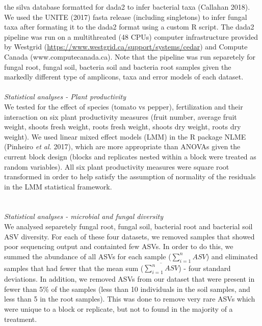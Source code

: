 \documentclass[11pt,]{article}
\begin{document}
the silva database formatted for dada2 to infer bacterial taxa (Callahan
2018). We used the UNITE (2017) fasta release (including singletons) to
infer fungal taxa after formating it to the dada2 format using a custom
R script. The dada2 pipeline was run on a multithreated (48 CPUs)
computer infrastructure provided by Westgrid
(\url{https://www.westgrid.ca/support/systems/cedar}) and Compute Canada
(www.computecanada.ca). Note that the pipeline was run separetely for
fungal root, fungal soil, bacteria soil and bacteria root samples given
the markedly different type of amplicons, taxa and error models of each
dataset. ~\\
\hspace*{0.333em}\\
\emph{Statistical analyses - Plant productivity}\\
We tested for the effect of species (tomato vs pepper), fertilization
and their interaction on six plant productivity measures (fruit number,
average fruit weight, shoots fresh weight, roots fresh weight, shoots
dry weight, roots dry weight). We used linear mixed effect models (LMM)
in the R package NLME (Pinheiro \emph{et al.} 2017), which are more
appropriate than ANOVAs given the current block design (blocks and
replicates nested within a block were treated as random variables). All
six plant productivity measures were square root transformed in order to
help satisfy the assumption of normality of the residuals in the LMM
statistical framework.\\
\hspace*{0.333em}\\
\hspace*{0.333em}\\
\emph{Statistical analyses - microbial and fungal diversity}\\
We analysed separetely fungal root, fungal soil, bacterial root and
bacterial soil ASV diversity. For each of these four datasets, we
removed samples that showed poor sequencing output and containted few
ASVs. In order to do this, we summed the abundance of all ASVs for each
sample (\(\sum_{i=1}^n ASV\)) and eliminated samples that had fewer that
the mean sum (\(\overline{\sum_{i=1}^n ASV}\)) - four standard
deviations. In addition, we removed ASVs from our dataset that were
present in fewer than 5\% of the samples (less than 10 individuals in
the soil samples, and less than 5 in the root samples). This was done to
remove very rare ASVs which were unique to a block or replicate, but not
to found in the majority of a treatment.\\
\end{document}
